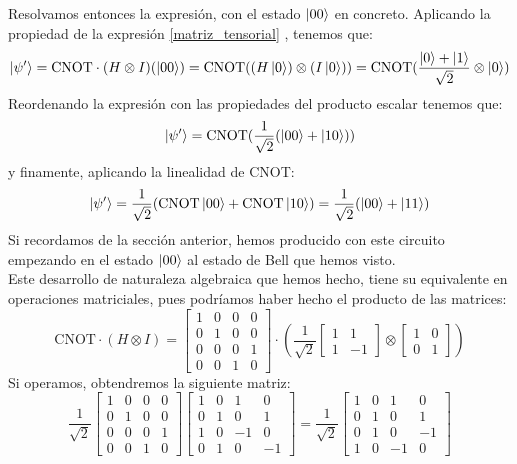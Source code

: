\documentclass[a4paper]{article}
\numberwithin{equation}{section}
\begin{document}
Resolvamos entonces la expresión, con el estado $\ket{00}$ en concreto. Aplicando la propiedad de la expresión \ref{matriz_tensorial} , tenemos que:
\begin{equation}
\ket{\psi'} = \textrm{CNOT}\cdot(H\otimes I)(\ket{00}) = \textrm{CNOT}((H\ket{0}) \otimes (I\ket{0})) = \textrm{CNOT}(\frac{\ket{0}+\ket{1}}{\sqrt{2}}\otimes\ket{0})
\end{equation}
Reordenando la expresión con las propiedades del producto escalar tenemos que:
\begin{equation}
\ket{\psi'} = \textrm{CNOT}(\frac{1}{\sqrt{2}}(\ket{00} + \ket{10}))
\end{equation}
y finamente, aplicando la linealidad de CNOT:
\begin{equation}
\ket{\psi'} = \frac{1}{\sqrt{2}}(\textrm{CNOT}\ket{00} + \textrm{CNOT}\ket{10}) = \frac{1}{\sqrt{2}}(\ket{00} + \ket{11})
\end{equation}
Si recordamos de la sección anterior, hemos producido con este circuito empezando en el estado $\ket{00}$ al estado de Bell que hemos visto.\\
Este desarrollo de naturaleza algebraica que hemos hecho, tiene su equivalente en operaciones matriciales, pues podríamos haber hecho el producto de las matrices:
\begin{equation}
\textrm{CNOT}\cdot(H\otimes I) = \begin{bmatrix}
1 & 0 & 0 & 0 \\
0 & 1 & 0 & 0 \\
0 & 0 & 0 & 1 \\
0 & 0 & 1 & 0 
\end{bmatrix} \cdot \left( \frac{1}{\sqrt{2}}
\begin{bmatrix}
1 & 1 \\
1 & -1 
\end{bmatrix} \otimes
\begin{bmatrix}
1 & 0 \\
0 & 1 
\end{bmatrix}\right)
\end{equation}
Si operamos, obtendremos la siguiente matriz:
\begin{equation}
\frac{1}{\sqrt{2}}
\begin{bmatrix}
1 & 0 & 0 & 0 \\
0 & 1 & 0 & 0 \\
0 & 0 & 0 & 1 \\
0 & 0 & 1 & 0 
\end{bmatrix}
\begin{bmatrix}
1 & 0 & 1 & 0 \\
0 & 1 & 0 & 1 \\
1 & 0 & -1 & 0 \\
0 & 1 & 0 & -1 
\end{bmatrix} =
\frac{1}{\sqrt{2}}
\begin{bmatrix}
1 & 0 & 1 & 0 \\
0 & 1 & 0 & 1 \\
0 & 1 & 0 & -1 \\
1 & 0 & -1 & 0
\end{bmatrix}
\end{equation}
\end{document}
